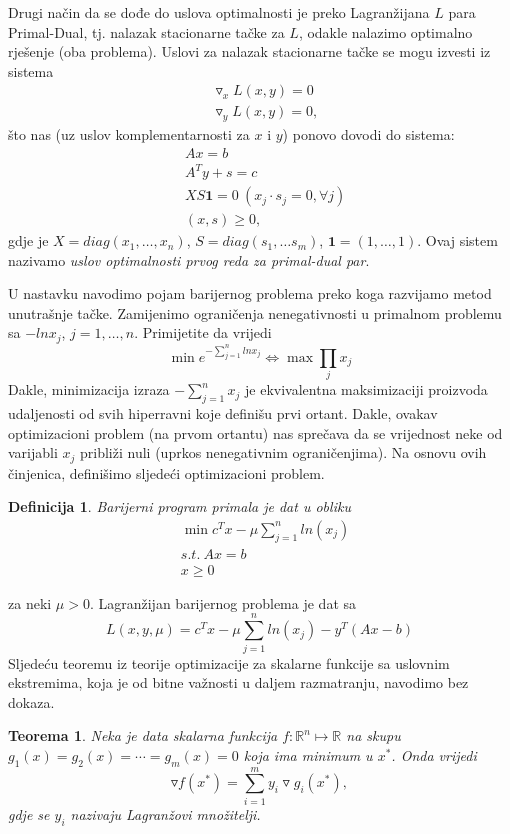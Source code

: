 \documentclass[a4paper, utf8, 11pt, colorlinks]{book}
\newtheorem{definition}{Definicija}
\newtheorem{thm}{Teorema}
\begin{document}
Drugi način da se dođe do uslova optimalnosti je preko Lagranžijana $L$ para Primal-Dual, tj. nalazak stacionarne tačke za $L$, odakle nalazimo optimalno rješenje (oba problema).  Uslovi za nalazak stacionarne tačke se mogu izvesti iz sistema
\begin{align}
	&\triangledown_x L(x,y) = 0\\
	&\triangledown_y L(x,y) = 0,
\end{align} 
što nas (uz uslov komplementarnosti za $x$ i $y$) ponovo dovodi do sistema:
\begin{align}
	&Ax = b \\
	&A^T y + s = c \\
	&XS\mathbf{1} = 0 \ (x_j \cdot s_j =0 , \forall j) \\
	&  (x, s ) \geq 0,
\end{align}
gdje je $X = diag (x_1, \ldots, x_n)$, $S= diag(s_1,\ldots s_m)$, $\mathbf{1}=(1,\ldots, 1)$. Ovaj sistem nazivamo \emph{uslov optimalnosti prvog reda za primal-dual par}. 

U nastavku navodimo pojam barijernog problema preko koga razvijamo metod unutrašnje tačke. Zamijenimo ograničenja nenegativnosti u primalnom problemu sa $-ln x_j$, $j=1,\ldots,n$.   
Primijetite da vrijedi 
$$\min e^{-\sum_{j=1}^n ln x_j} \Leftrightarrow \max \prod_{j} x_j $$
Dakle, minimizacija izraza $-\sum_{j=1}^n x_j$ je ekvivalentna maksimizaciji proizvoda udaljenosti od svih hiperravni koje definišu prvi ortant. Dakle, ovakav optimizacioni problem (na prvom ortantu) nas sprečava da se vrijednost neke od varijabli $x_j$ približi nuli (uprkos nenegativnim ograničenjima).  Na osnovu ovih činjenica, definišimo sljedeći optimizacioni problem. 

\begin{definition}
	Barijerni program  primala je dat u obliku 
	\begin{align*}
		&\min c^T x - \mu \sum_{j=1}^n ln(x_j) \\
		&{s.t. \ } A x = b \\
		& x \geq 0
	\end{align*}
\end{definition}
za neki $\mu >0$. Lagranžijan barijernog problema je dat sa 
$$  L(x, y, \mu) = c^T x - \mu \sum_{j=1}^n ln(x_j)  - y^T(Ax - b) $$
Sljedeću teoremu iz teorije optimizacije  za skalarne funkcije sa uslovnim ekstremima, koja je od bitne važnosti u daljem razmatranju, navodimo   bez dokaza. 
\begin{thm}
	Neka je data skalarna funkcija  $f:\mathbb{R}^n \mapsto \mathbb{R}$ na skupu $g_1(x)=g_2(x)= \cdots = g_m(x) =0$ koja ima minimum u $x^*$. Onda vrijedi 
	$$ \triangledown f (x^*) = \sum_{i=1}^m y_i \triangledown g_i(x^*),$$
	gdje se $y_i$ nazivaju Lagranžovi množitelji. 
\end{thm}
\end{document}
